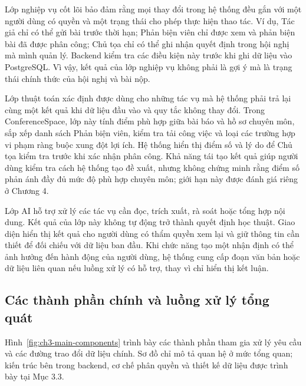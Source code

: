 Lớp nghiệp vụ cốt lõi bảo đảm rằng mọi thay đổi trong hệ thống đều gắn với một người dùng có quyền và một trạng thái cho phép thực hiện thao tác. Ví dụ, Tác giả chỉ có thể gửi bài trước thời hạn; Phản biện viên chỉ được xem và phản biện bài đã được phân công; Chủ tọa chỉ có thể ghi nhận quyết định trong hội nghị mà mình quản lý. Backend kiểm tra các điều kiện này trước khi ghi dữ liệu vào PostgreSQL. Vì vậy, kết quả của lớp nghiệp vụ không phải là gợi ý mà là trạng thái chính thức của hội nghị và bài nộp.

Lớp thuật toán xác định được dùng cho những tác vụ mà hệ thống phải trả lại cùng một kết quả khi dữ liệu đầu vào và quy tắc không thay đổi. Trong ConferenceSpace, lớp này tính điểm phù hợp giữa bài báo và hồ sơ chuyên môn, sắp xếp danh sách Phản biện viên, kiểm tra tải công việc và loại các trường hợp vi phạm ràng buộc xung đột lợi ích. Hệ thống hiển thị điểm số và lý do để Chủ tọa kiểm tra trước khi xác nhận phân công. Khả năng tái tạo kết quả giúp người dùng kiểm tra cách hệ thống tạo đề xuất, nhưng không chứng minh rằng điểm số phản ánh đầy đủ mức độ phù hợp chuyên môn; giới hạn này được đánh giá riêng ở Chương 4.

Lớp AI hỗ trợ xử lý các tác vụ cần đọc, trích xuất, rà soát hoặc tổng hợp nội dung. Kết quả của lớp này không tự động trở thành quyết định học thuật. Giao diện hiển thị kết quả cho người dùng có thẩm quyền xem lại và giữ thông tin cần thiết để đối chiếu với dữ liệu ban đầu. Khi chức năng tạo một nhận định có thể ảnh hưởng đến hành động của người dùng, hệ thống cung cấp đoạn văn bản hoặc dữ liệu liên quan nếu luồng xử lý có hỗ trợ, thay vì chỉ hiển thị kết luận.

\subsection{Các thành phần chính và luồng xử lý tổng quát}

Hình~\ref{fig:ch3-main-components} trình bày các thành phần tham gia xử lý yêu cầu và các đường trao đổi dữ liệu chính. Sơ đồ chỉ mô tả quan hệ ở mức tổng quan; kiến trúc bên trong backend, cơ chế phân quyền và thiết kế dữ liệu được trình bày tại Mục 3.3.

